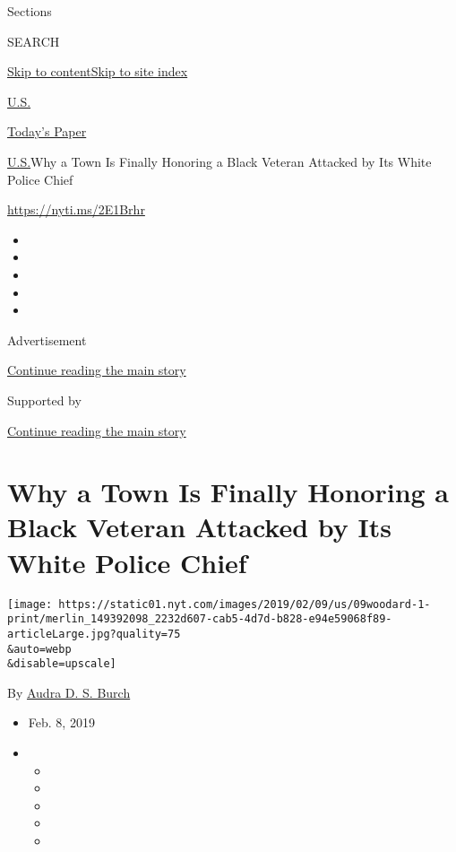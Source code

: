 Sections

SEARCH

\protect\hyperlink{site-content}{Skip to
content}\protect\hyperlink{site-index}{Skip to site index}

\href{https://www.nytimes.com/section/us}{U.S.}

\href{https://myaccount.nytimes.com/auth/login?response_type=cookie\&client_id=vi}{}

\href{https://www.nytimes.com/section/todayspaper}{Today's Paper}

\href{/section/us}{U.S.}\textbar{}Why a Town Is Finally Honoring a Black
Veteran Attacked by Its White Police Chief

\url{https://nyti.ms/2E1Brhr}

\begin{itemize}
\item
\item
\item
\item
\item
\end{itemize}

Advertisement

\protect\hyperlink{after-top}{Continue reading the main story}

Supported by

\protect\hyperlink{after-sponsor}{Continue reading the main story}

\hypertarget{why-a-town-is-finally-honoring-a-black-veteran-attacked-by-its-white-police-chief}{%
\section{Why a Town Is Finally Honoring a Black Veteran Attacked by Its
White Police
Chief}\label{why-a-town-is-finally-honoring-a-black-veteran-attacked-by-its-white-police-chief}}

\texttt{[image: https://static01.nyt.com/images/2019/02/09/us/09woodard-1-print/merlin\_149392098\_2232d607-cab5-4d7d-b828-e94e59068f89-articleLarge.jpg?quality=75\\\&auto=webp\\\&disable=upscale]}

By \href{https://www.nytimes.com/by/audra-d-s-burch}{Audra D. S. Burch}

\begin{itemize}
\item
  Feb. 8, 2019
\item
  \begin{itemize}
  \item
  \item
  \item
  \item
  \item
  \end{itemize}
\end{itemize}


